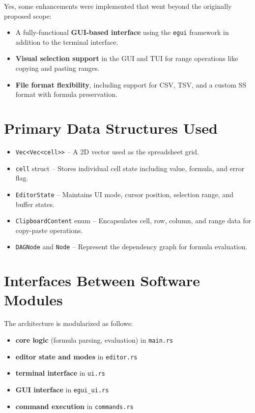 \documentclass{article}
\begin{document}
Yes, some enhancements were implemented that went beyond the originally proposed scope:
\begin{itemize}
  \item A fully-functional \textbf{GUI-based interface} using the \texttt{egui} framework in addition to the terminal interface.
  \item \textbf{Visual selection support} in the GUI and TUI for range operations like copying and pasting ranges.
  \item \textbf{File format flexibility}, including support for CSV, TSV, and a custom SS format with formula preservation.
\end{itemize}

\section{Primary Data Structures Used}

\begin{itemize}
  \item \texttt{Vec<Vec<cell>>} – A 2D vector used as the spreadsheet grid.
  \item \texttt{cell} struct – Stores individual cell state including value, formula, and error flag.
  \item \texttt{EditorState} – Maintains UI mode, cursor position, selection range, and buffer states.
  \item \texttt{ClipboardContent} enum – Encapsulates cell, row, column, and range data for copy-paste operations.
  \item \texttt{DAGNode} and \texttt{Node} – Represent the dependency graph for formula evaluation.
\end{itemize}

\section{Interfaces Between Software Modules}

The architecture is modularized as follows:
\begin{itemize}
  \item \textbf{core logic} (formula parsing, evaluation) in \texttt{main.rs}
  \item \textbf{editor state and modes} in \texttt{editor.rs}
  \item \textbf{terminal interface} in \texttt{ui.rs}
  \item \textbf{GUI interface} in \texttt{egui\_ui.rs}
  \item \textbf{command execution} in \texttt{commands.rs}
\end{itemize}
\end{document}
